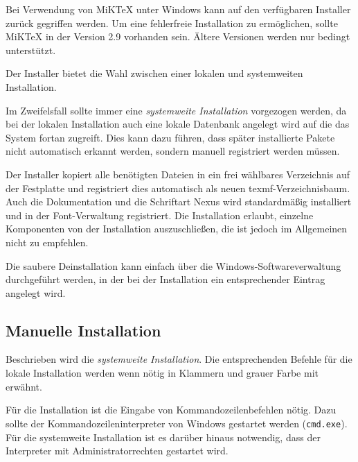 Bei Verwendung von MiKTeX unter Windows kann auf den verfügbaren Installer
zurück gegriffen werden. Um eine fehlerfreie Installation zu ermöglichen,
sollte MiKTeX in der Version 2.9 vorhanden sein.
Ältere Versionen werden nur bedingt unterstützt.

Der Installer bietet die Wahl zwischen einer lokalen und systemweiten
Installation.
\begin{important}
Im Zweifelsfall sollte immer eine \emph{systemweite Installation}
vorgezogen werden, da bei der lokalen Installation auch eine lokale
Datenbank angelegt wird auf die das System fortan zugreift.
Dies kann dazu führen, dass später installierte Pakete nicht automatisch
erkannt werden, sondern manuell registriert werden müssen.
\end{important}

Der Installer kopiert alle benötigten Dateien in ein frei wählbares Verzeichnis
auf der Festplatte und registriert dies automatisch als neuen texmf-Verzeichnisbaum.
Auch die Dokumentation und die Schriftart Nexus wird standardmäßig installiert
und in der Font-Verwaltung registriert.
Die Installation erlaubt, einzelne Komponenten von der Installation auszuschließen,
die ist jedoch im Allgemeinen nicht zu empfehlen.\par

Die saubere Deinstallation kann einfach über die Windows-Softwareverwaltung 
durchgeführt werden, in der bei der Installation ein entsprechender Eintrag
angelegt wird.

\newcommand\localinstall[1]{%
  {\leavevmode\color{tuGray80}(#1)}%
}

\subsection{Manuelle Installation} %

Beschrieben wird die \emph{systemweite Installation}.
Die entsprechenden Befehle für die lokale Installation werden wenn nötig
in Klammern und grauer Farbe mit erwähnt.

Für die Installation ist die Eingabe von Kommandozeilenbefehlen nötig.
Dazu sollte der Kommandozeileninterpreter von Windows gestartet
werden (\lstinline{cmd.exe}). Für die systemweite Installation ist es
darüber hinaus notwendig, dass der Interpreter mit
Administratorrechten gestartet wird. %


